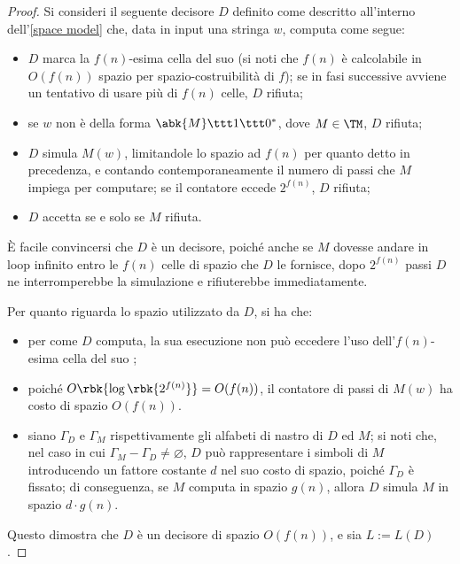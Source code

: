 \documentclass[a4paper, 12pt]{report}
\begin{document}
    \begin{proof}
        Si consideri il seguente decisore $D$ definito come descritto all'interno dell'\cref{space model} che, data in input una stringa $w$, computa come segue:

        \begin{itemize}
            \item $D$ marca la $f(n)$-esima cella del suo  (si noti che $f(n)$ è calcolabile in $O(f(n))$ spazio per spazio-costruibilità di $f$); se in fasi successive avviene un tentativo di usare più di $f(n)$ celle, $D$ rifiuta;
            \item se $w$ non è della forma $\abk{M} \ttt 1 \ttt 0^*$, dove $M \in \TM$, $D$ rifiuta;
            \item $D$ simula $M(w)$, limitandole lo spazio ad $f(n)$ per quanto detto in precedenza, e contando contemporaneamente il numero di passi che $M$ impiega per computare; se il contatore eccede $2^{f(n)}$, $D$ rifiuta;
            \item $D$ accetta se e solo se $M$ rifiuta.
        \end{itemize}

        È facile convincersi che $D$ è un decisore, poiché anche se $M$ dovesse andare in loop infinito entro le $f(n)$ celle di spazio che $D$ le fornisce, dopo $2^{f(n)}$ passi $D$ ne interromperebbe la simulazione e rifiuterebbe immediatamente.

        Per quanto riguarda lo spazio utilizzato da $D$, si ha che:

        \begin{itemize}
            \item per come $D$ computa, la sua esecuzione non può eccedere l'uso dell'$f(n)$-esima cella del suo ;
            \item poiché $O \rbk{\log \rbk{2^{f(n)}}} = O(f(n))$, il contatore di passi di $M(w)$ ha costo di spazio $O(f(n))$.
            \item siano $\Gamma_D$ e $\Gamma_M$ rispettivamente gli alfabeti di nastro di $D$ ed $M$; si noti che, nel caso in cui $\Gamma_M - \Gamma_D \neq \varnothing$, $D$ può rappresentare i simboli di $M$ introducendo un fattore costante $d$ nel suo costo di spazio, poiché $\Gamma_D$ è fissato; di conseguenza, se $M$ computa in spazio $g(n)$, allora $D$ simula $M$ in spazio $d \cdot g(n)$.
        \end{itemize}

        Questo dimostra che $D$ è un decisore di spazio $O(f(n))$, e sia $L := L(D)$.


\end{proof}
\end{document}
